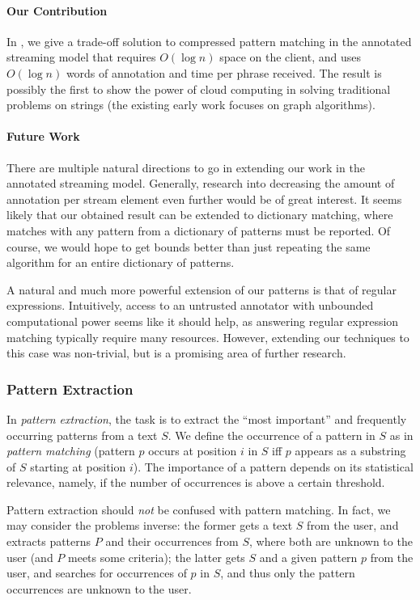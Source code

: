 \paragraph{Our Contribution} 
In , we give a trade-off solution to compressed pattern matching in the annotated streaming model that requires $O(\log n)$ space on the client, and uses $O(\log n)$ words of annotation and time per phrase received. 
The result is possibly the first to show the power of cloud computing in solving traditional problems on strings (the existing early work focuses on graph algorithms). 


\paragraph{Future Work}
There are multiple natural directions to go in extending our work in the annotated streaming model. Generally, research into decreasing the amount of annotation per stream element even further would be of great interest. 
It seems likely that our obtained result can be extended to dictionary matching, where matches with any pattern from a dictionary of patterns must be reported. Of course, we would hope to get bounds better than just repeating the same algorithm for an entire dictionary of patterns. 

A natural and much more powerful extension of our patterns is that of regular expressions. Intuitively, access to an untrusted annotator with unbounded computational power seems like it should help, as answering regular expression matching typically require many resources. However, extending our techniques to this case was non-trivial, but is a promising area of further research. 


\clearpage
\subsubsection{Pattern Extraction}
In \emph{pattern extraction}, the task is to extract the ``most important'' and frequently occurring patterns from a text $S$.
We define the occurrence of a pattern in $S$ as in \emph{pattern matching} (pattern $p$ occurs at position $i$ in $S$ iff $p$ appears as a substring of $S$ starting at position $i$). The importance of a pattern depends on its statistical relevance, namely, if the number of occurrences is above a certain threshold.

Pattern extraction should \emph{not} be confused with pattern matching. In fact, we may consider the problems inverse: the former gets a text $S$ from the user, and extracts patterns $P$ and their occurrences from $S$, where both are unknown to the user (and $P$ meets some criteria); the latter gets $S$ and a given pattern $p$ from the user, and searches for occurrences of $p$ in $S$, and thus only the pattern occurrences are unknown to the user.

